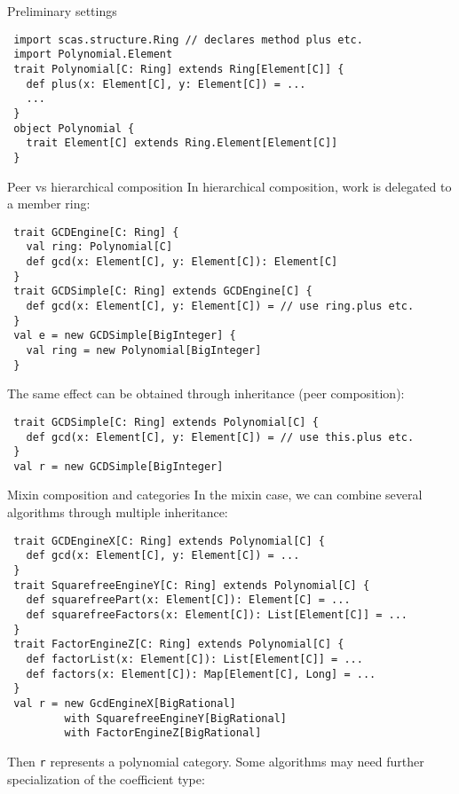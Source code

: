 \documentclass[final]{beamer}
\newcommand{\code}[1]{\texttt{#1}}
\begin{document}
\begin{frame}[fragile]
\begin{columns}[t]
\begin{column}{.3\linewidth}
  \begin{block}{\large Preliminary settings}
\tiny
\begin{lstlisting}
 import scas.structure.Ring // declares method plus etc.
 import Polynomial.Element
 trait Polynomial[C: Ring] extends Ring[Element[C]] {
   def plus(x: Element[C], y: Element[C]) = ...
   ...
 }
 object Polynomial {
   trait Element[C] extends Ring.Element[Element[C]]
 }
\end{lstlisting}
  \end{block}
  \hfill
  \begin{block}{\large Peer vs hierarchical composition}
\tiny
{\footnotesize In hierarchical composition, work is delegated to
a member ring:}
\begin{lstlisting}
 trait GCDEngine[C: Ring] {
   val ring: Polynomial[C]
   def gcd(x: Element[C], y: Element[C]): Element[C]
 }
 trait GCDSimple[C: Ring] extends GCDEngine[C] {
   def gcd(x: Element[C], y: Element[C]) = // use ring.plus etc.
 }
 val e = new GCDSimple[BigInteger] {
   val ring = new Polynomial[BigInteger]
 }
\end{lstlisting}
{\footnotesize The same effect can be obtained through inheritance
(peer composition):}
\begin{lstlisting}
 trait GCDSimple[C: Ring] extends Polynomial[C] {
   def gcd(x: Element[C], y: Element[C]) = // use this.plus etc.
 }
 val r = new GCDSimple[BigInteger]
\end{lstlisting}
  \end{block}
  \hfill
  \begin{block}{\large Mixin composition and categories}
\tiny
{\footnotesize In the mixin case, we can combine several
algorithms through multiple inheritance:}
\begin{lstlisting}
 trait GCDEngineX[C: Ring] extends Polynomial[C] {
   def gcd(x: Element[C], y: Element[C]) = ...
 }
 trait SquarefreeEngineY[C: Ring] extends Polynomial[C] {
   def squarefreePart(x: Element[C]): Element[C] = ...
   def squarefreeFactors(x: Element[C]): List[Element[C]] = ...
 }
 trait FactorEngineZ[C: Ring] extends Polynomial[C] {
   def factorList(x: Element[C]): List[Element[C]] = ...
   def factors(x: Element[C]): Map[Element[C], Long] = ...
 }
 val r = new GcdEngineX[BigRational] 
         with SquarefreeEngineY[BigRational]
         with FactorEngineZ[BigRational]
\end{lstlisting}
{\footnotesize Then \code{r} represents a polynomial category.
Some algorithms may need further specialization of the coefficient
type:}

\end{block}
\end{column}
\end{columns}
\end{frame}
\end{document}
